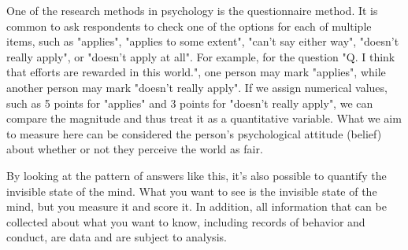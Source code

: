 \documentclass{ltjsbook}
\begin{document}
One of the research methods in psychology is the questionnaire method. It is common to ask respondents to check one of the options for each of multiple items, such as "applies", "applies to some extent", "can't say either way", "doesn't really apply", or "doesn't apply at all". For example, for the question "Q. I think that efforts are rewarded in this world.", one person may mark "applies", while another person may mark "doesn't really apply". If we assign numerical values, such as 5 points for "applies" and 3 points for "doesn't really apply", we can compare the magnitude and thus treat it as a quantitative variable. What we aim to measure here can be considered the person's psychological attitude (belief) about whether or not they perceive the world as fair.

By looking at the pattern of answers like this, it's also possible to quantify the invisible state of the mind. What you want to see is the invisible state of the mind, but you measure it and score it. In addition, all information that can be collected about what you want to know, including records of behavior and conduct, are data and are subject to analysis.

\end{document}
